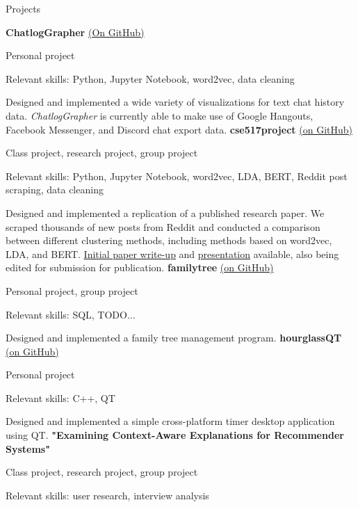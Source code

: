 \begin{rubric}{Projects}

	\textbf{ChatlogGrapher} \href{https://github.com/cephcyn/ChatlogGrapher}{(On GitHub)}
	\par Personal project
	\par Relevant skills: Python, Jupyter Notebook, word2vec, data cleaning
	\par Designed and implemented a wide variety of visualizations for text chat history data. \textit{ChatlogGrapher} is currently able to make use of Google Hangouts, Facebook Messenger, and Discord chat export data.
	\textbf{cse517project} \href{https://github.com/cephcyn/cse517project}{(on GitHub)}
	\par Class project, research project, group project
	\par Relevant skills: Python, Jupyter Notebook, word2vec, LDA, BERT, Reddit post scraping, data cleaning
	\par Designed and implemented a replication of a published research paper. We scraped thousands of new posts from Reddit and conducted a comparison between different clustering methods, including methods based on word2vec, LDA, and BERT. \href{https://github.com/cephcyn/cephcyn.github.io/raw/master/documents/u_cse517/final_writeup.pdf}{Initial paper write-up} and \href{https://www.youtube.com/watch?v=SgzpiQQEeEU}{presentation} available, also being edited for submission for publication.
	\textbf{familytree} \href{https://github.com/cephcyn/familytree}{(on GitHub)}
	\par Personal project, group project
	\par Relevant skills: SQL, TODO...
	\par Designed and implemented a family tree management program.
	\textbf{hourglassQT} \href{https://github.com/cephcyn/hourglassQT}{(on GitHub)}
	\par Personal project
	\par Relevant skills: C++, QT
	\par Designed and implemented a simple cross-platform timer desktop application using QT.
\entry*[2020] %
	\textbf{"Examining Context-Aware Explanations for Recommender Systems"} %
	\par Class project, research project, group project
	\par Relevant skills: user research, interview analysis

\end{rubric}
